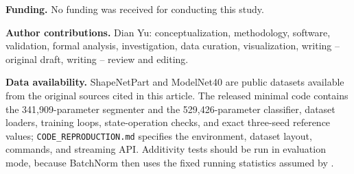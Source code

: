 \documentclass[11pt,a4paper]{article}
\begin{document}
\noindent\textbf{Funding.} No funding was received for conducting this study.

\noindent\textbf{Author contributions.} Dian Yu: conceptualization, methodology,
software, validation, formal analysis, investigation, data curation,
visualization, writing -- original draft, writing -- review and editing.

\noindent\textbf{Data availability.} ShapeNetPart and ModelNet40 are public
datasets available from the original sources cited in this article. The released
minimal code contains the 341,909-parameter segmenter and the
529,426-parameter classifier, dataset loaders, training loops, state-operation
checks, and exact three-seed reference values; \texttt{CODE\_REPRODUCTION.md}
specifies the environment, dataset layout, commands, and streaming API.
Additivity tests should be run in evaluation mode, because BatchNorm then uses
the fixed running statistics assumed by .



\end{document}
